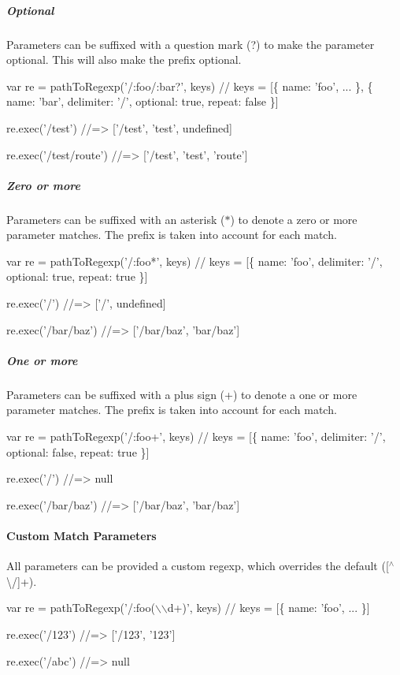\subparagraph*{Optional}

Parameters can be suffixed with a question mark ({\ttfamily ?}) to make the parameter optional. This will also make the prefix optional.


\begin{DoxyCode}
var re = pathToRegexp('/:foo/:bar?', keys)
// keys = [\{ name: 'foo', ... \}, \{ name: 'bar', delimiter: '/', optional: true, repeat: false \}]

re.exec('/test')
//=> ['/test', 'test', undefined]

re.exec('/test/route')
//=> ['/test', 'test', 'route']
\end{DoxyCode}


\subparagraph*{Zero or more}

Parameters can be suffixed with an asterisk ({\ttfamily $\ast$}) to denote a zero or more parameter matches. The prefix is taken into account for each match.


\begin{DoxyCode}
var re = pathToRegexp('/:foo*', keys)
// keys = [\{ name: 'foo', delimiter: '/', optional: true, repeat: true \}]

re.exec('/')
//=> ['/', undefined]

re.exec('/bar/baz')
//=> ['/bar/baz', 'bar/baz']
\end{DoxyCode}


\subparagraph*{One or more}

Parameters can be suffixed with a plus sign ({\ttfamily +}) to denote a one or more parameter matches. The prefix is taken into account for each match.


\begin{DoxyCode}
var re = pathToRegexp('/:foo+', keys)
// keys = [\{ name: 'foo', delimiter: '/', optional: false, repeat: true \}]

re.exec('/')
//=> null

re.exec('/bar/baz')
//=> ['/bar/baz', 'bar/baz']
\end{DoxyCode}


\paragraph*{Custom Match Parameters}

All parameters can be provided a custom regexp, which overrides the default ({\ttfamily \mbox{[}$^\wedge$\textbackslash{}/\mbox{]}+}).


\begin{DoxyCode}
var re = pathToRegexp('/:foo(\(\backslash\)\(\backslash\)d+)', keys)
// keys = [\{ name: 'foo', ... \}]

re.exec('/123')
//=> ['/123', '123']

re.exec('/abc')
//=> null
\end{DoxyCode}


